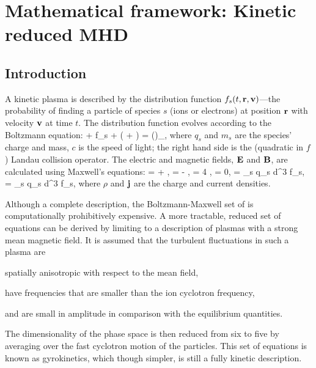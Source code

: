 \chapter{Mathematical framework: Kinetic reduced MHD}
\label{app:eq}
    
    
    \section{Introduction}

    A kinetic plasma is described by the distribution function 
    $f_s(t, \mathbf{r},\mathbf{v})$---the probability of finding a particle of species $s$ (ions or electrons) at
    position $\mathbf{r}$ with velocity $\mathbf{v}$ at time $t$. The distribution function
    evolves according to the Boltzmann equation:
    \beq
         + \cdot\nabla f_s +  \lt( +
        \rt)\cdot{} =
        \lt(\rt)_{},
        \label{eqs:eq:boltzmann}
    \eeq
    where $q_s$ and $m_s$ are the species' charge and mass, $c$ is the speed of light; the
    right hand side is the (quadratic in $f$) Landau collision operator. The electric and magnetic fields,
    $\mathbf{E}$ and $\mathbf{B}$, are calculated using Maxwell's equations:
    \beq
        \nabla \times {} =   + ,
        \label{eqs:eq:ampere}
    \eeq
    \beq
        \nabla \times {} = -  , \label{eqs:eq:faraday}
    \eeq
    \beq
        \nabla\cdot{} = 4 \pi \rho,\label{eqs:eq:poisson}
    \eeq
    \beq
        \nabla\cdot {} = 0,\label{eqs:eq:divb}
    \eeq
    \beq
        \rho = \sum_s q_s \int d^3  f_s, \quad {} = \sum_s q_s \int
        d^3 f_s,
    \eeq
    where $\rho$ and $\mathbf{j}$ are the charge and current densities. 

    Although a complete description, the Boltzmann-Maxwell set of
     is computationally prohibitively expensive. A
    more tractable,
    reduced set of equations can be derived by limiting to a description of plasmas with a strong mean magnetic
    field. It is assumed that the turbulent fluctuations in such a plasma are 
    \begin{inparaenum}[(i)] 
    \item spatially anisotropic with respect to the mean field, 
    \item have frequencies that are smaller than the ion cyclotron frequency, 
    \item and are small in amplitude in comparison with the equilibrium quantities. 
    \end{inparaenum}
    The dimensionality of the phase space is then reduced from six to five by averaging
    over the fast cyclotron motion of the particles. This set of equations is known as
    gyrokinetics, which though simpler, is still a fully kinetic description.

